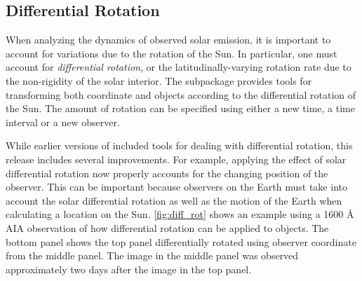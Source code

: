 \subsection{Differential Rotation}
\label{sec:differential_rotation}



When analyzing the dynamics of observed solar emission, it is important to account for variations due to the rotation of the Sun.
In particular, one must account for \textit{differential rotation}, or the latitudinally-varying rotation rate due to the non-rigidity of the solar interior.
The  subpackage provides tools for transforming both  coordinate and  objects according to the differential rotation of the Sun.
The amount of rotation can be specified using either a new time, a time interval or a new observer.

While earlier versions of \sunpy included tools for dealing with differential rotation, this release includes several improvements.
For example, applying the effect of solar differential rotation now properly accounts for the changing position of the observer.
This can be important because observers on the Earth must take into account the solar differential rotation as well as the motion of the Earth when calculating a location on the Sun.
\autoref{fig:diff_rot} shows an example using a 1600 \AA{} AIA observation of how differential rotation can be applied to  objects.
The bottom panel shows the top panel differentially rotated using observer coordinate from the middle panel.
The image in the middle panel was observed approximately two days after the image in the top panel.

